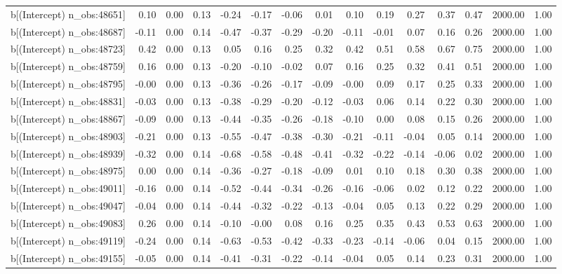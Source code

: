 \begin{table}[ht]
\begin{tabular}{rrrrrrrrrrrrrrr}
  b[(Intercept) n\_obs:48651] & 0.10 & 0.00 & 0.13 & -0.24 & -0.17 & -0.06 & 0.01 & 0.10 & 0.19 & 0.27 & 0.37 & 0.47 & 2000.00 & 1.00 \\ 
  b[(Intercept) n\_obs:48687] & -0.11 & 0.00 & 0.14 & -0.47 & -0.37 & -0.29 & -0.20 & -0.11 & -0.01 & 0.07 & 0.16 & 0.26 & 2000.00 & 1.00 \\ 
  b[(Intercept) n\_obs:48723] & 0.42 & 0.00 & 0.13 & 0.05 & 0.16 & 0.25 & 0.32 & 0.42 & 0.51 & 0.58 & 0.67 & 0.75 & 2000.00 & 1.00 \\ 
  b[(Intercept) n\_obs:48759] & 0.16 & 0.00 & 0.13 & -0.20 & -0.10 & -0.02 & 0.07 & 0.16 & 0.25 & 0.32 & 0.41 & 0.51 & 2000.00 & 1.00 \\ 
  b[(Intercept) n\_obs:48795] & -0.00 & 0.00 & 0.13 & -0.36 & -0.26 & -0.17 & -0.09 & -0.00 & 0.09 & 0.17 & 0.25 & 0.33 & 2000.00 & 1.00 \\ 
  b[(Intercept) n\_obs:48831] & -0.03 & 0.00 & 0.13 & -0.38 & -0.29 & -0.20 & -0.12 & -0.03 & 0.06 & 0.14 & 0.22 & 0.30 & 2000.00 & 1.00 \\ 
  b[(Intercept) n\_obs:48867] & -0.09 & 0.00 & 0.13 & -0.44 & -0.35 & -0.26 & -0.18 & -0.10 & 0.00 & 0.08 & 0.15 & 0.26 & 2000.00 & 1.00 \\ 
  b[(Intercept) n\_obs:48903] & -0.21 & 0.00 & 0.13 & -0.55 & -0.47 & -0.38 & -0.30 & -0.21 & -0.11 & -0.04 & 0.05 & 0.14 & 2000.00 & 1.00 \\ 
  b[(Intercept) n\_obs:48939] & -0.32 & 0.00 & 0.14 & -0.68 & -0.58 & -0.48 & -0.41 & -0.32 & -0.22 & -0.14 & -0.06 & 0.02 & 2000.00 & 1.00 \\ 
  b[(Intercept) n\_obs:48975] & 0.00 & 0.00 & 0.14 & -0.36 & -0.27 & -0.18 & -0.09 & 0.01 & 0.10 & 0.18 & 0.30 & 0.38 & 2000.00 & 1.00 \\ 
  b[(Intercept) n\_obs:49011] & -0.16 & 0.00 & 0.14 & -0.52 & -0.44 & -0.34 & -0.26 & -0.16 & -0.06 & 0.02 & 0.12 & 0.22 & 2000.00 & 1.00 \\ 
  b[(Intercept) n\_obs:49047] & -0.04 & 0.00 & 0.14 & -0.44 & -0.32 & -0.22 & -0.13 & -0.04 & 0.05 & 0.13 & 0.22 & 0.29 & 2000.00 & 1.00 \\ 
  b[(Intercept) n\_obs:49083] & 0.26 & 0.00 & 0.14 & -0.10 & -0.00 & 0.08 & 0.16 & 0.25 & 0.35 & 0.43 & 0.53 & 0.63 & 2000.00 & 1.00 \\ 
  b[(Intercept) n\_obs:49119] & -0.24 & 0.00 & 0.14 & -0.63 & -0.53 & -0.42 & -0.33 & -0.23 & -0.14 & -0.06 & 0.04 & 0.15 & 2000.00 & 1.00 \\ 
  b[(Intercept) n\_obs:49155] & -0.05 & 0.00 & 0.14 & -0.41 & -0.31 & -0.22 & -0.14 & -0.04 & 0.05 & 0.14 & 0.23 & 0.31 & 2000.00 & 1.00 \\ 

\end{tabular}
\end{table}

